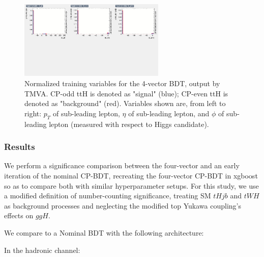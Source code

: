 \begin{figure}[htbp]
  \centering
  \includegraphics[width=0.62\textwidth]{figures/TMVABDTStudies/lep-vbls4vec/lep4vecvbls6.png}
  \caption{Normalized training variables for the 4-vector BDT, output by TMVA. CP-odd ttH is denoted as "signal" (blue); CP-even ttH is denoted as "background" (red). Variables shown are, from left to right: $p_{T}$ of sub-leading lepton, $\eta$ of sub-leading lepton, and $\phi$ of sub-leading lepton (measured with respect to Higgs candidate).}
  \label{fig:lep4vecvbls6}
\end{figure}

\clearpage

\subsubsection{Results}

We perform a significance comparison between the four-vector and an early iteration of the nominal CP-BDT, recreating the four-vector CP-BDT in xgboost so as to compare both with similar hyperparameter setups. For this study, we use a modified definition of number-counting significance, treating SM $tHjb$ and $tWH$ as background processes and neglecting the modified top Yukawa coupling's effects on $ggH$.

We compare to a Nominal BDT with the following architecture:

In the hadronic channel:


